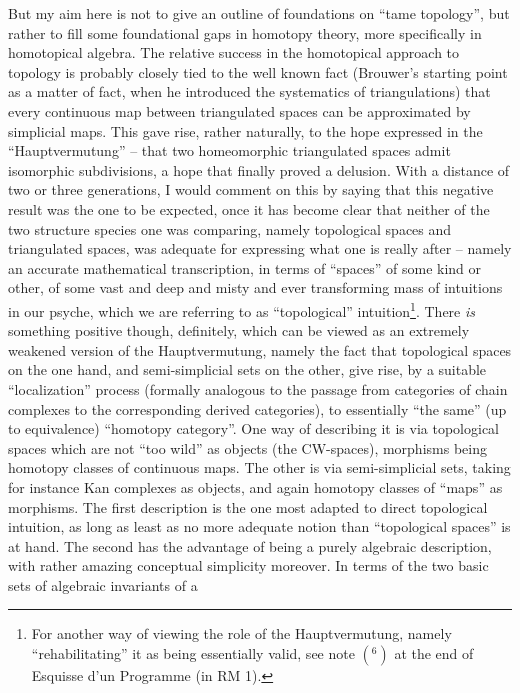 \label{sec:15}%
But my aim here is not to give an outline of foundations on ``tame
topology'', but rather to fill some foundational gaps in homotopy
theory, more specifically in homotopical algebra. The relative success
in the homotopical approach to topology is probably closely tied to
the well known fact (Brouwer's starting point as a matter of fact,
when he introduced the systematics of triangulations) that every
continuous map between triangulated spaces can be approximated by
simplicial maps. This gave rise, rather naturally, to the hope
expressed in the ``Hauptvermutung'' -- that two homeomorphic
triangulated spaces admit isomorphic subdivisions, a hope that finally
proved a delusion. With a distance of two or three generations, I
would comment on this by saying that this negative result was the one
to be expected, once it has become clear that neither of the two
structure species one was comparing, namely topological spaces and
triangulated spaces, was adequate for expressing what one is really
after -- namely an accurate mathematical transcription, in terms of
``spaces'' of some kind or other, of some vast and deep and misty and
ever transforming mass of intuitions in our psyche, which we are
referring to as ``topological'' intuition\footnote{For another way of viewing the role of the Hauptvermutung, namely ``rehabilitating'' it as being essentially valid, see note $(^6)$ at the end of Esquisse d'un Programme (in RM 1).}. There \emph{is} something
positive though, definitely, which can be viewed as an extremely
weakened version of the Hauptvermutung, namely the fact that
topological spaces on the one hand, and semi-simplicial sets on the
other, give rise, by a suitable ``localization'' process
(formally analogous to the passage from categories of chain complexes
to the corresponding derived categories), to
essentially ``the same'' (up to equivalence)
``homotopy category''. One way of describing it is via topological
spaces which are not ``too wild'' as objects (the CW-spaces),
morphisms being homotopy classes of continuous maps. The other is via
semi-simplicial sets, taking for instance Kan complexes as objects,
and again homotopy classes of ``maps'' as morphisms. The first
description is the one most adapted to direct topological intuition,
as long as least as no more adequate notion than ``topological
spaces'' is at hand. The second has the advantage of being a purely
algebraic description, with rather amazing conceptual simplicity
moreover. In terms of the two basic sets of algebraic invariants of a
